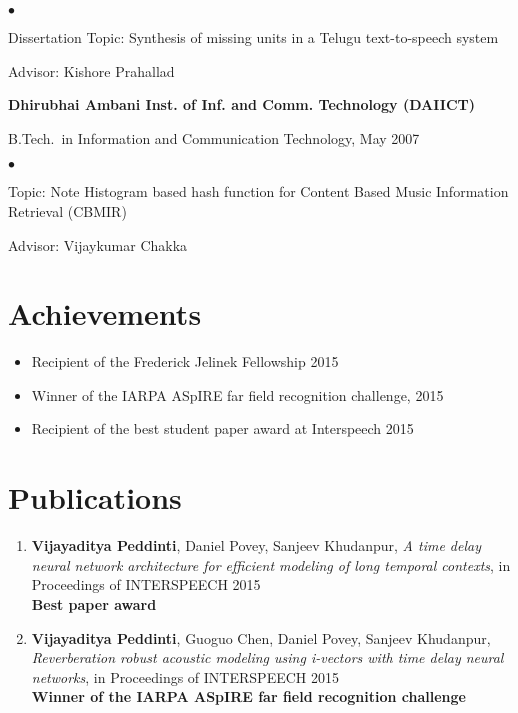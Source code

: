 \documentclass[margin,line,pifont,palatino,courier]{res}
\newenvironment{list1}{
  \begin{list}{\ding{113}}{%
      \setlength{\itemsep}{0in}
      \setlength{\parsep}{0in} \setlength{\parskip}{0in}
      \setlength{\topsep}{0in} \setlength{\partopsep}{0in}
      \setlength{\leftmargin}{0.17in}}}{\end{list}}
\newenvironment{list2}{
  \begin{list}{$\bullet$}{%
      \setlength{\itemsep}{0in}
      \setlength{\parsep}{0in} \setlength{\parskip}{0in}
      \setlength{\topsep}{0in} \setlength{\partopsep}{0in}
      \setlength{\leftmargin}{0.2in}}}{\end{list}}
\begin{document}
\begin{resume}
\begin{list1}
\begin{list2}
\vspace*{.05in}
\item Dissertation Topic:  Synthesis of missing units in a Telugu text-to-speech system 
\item Advisor: Kishore Prahallad
\end{list2}
\end{list1}

{\bf Dhirubhai Ambani Inst. of Inf. and Comm. Technology (DAIICT)}\\
\vspace*{-.1in}
\begin{list1}
\item[] B.Tech.~in Information and Communication Technology, May 2007

\begin{list2}
\vspace*{.05in}
\item Topic: Note Histogram based hash function for Content Based Music Information Retrieval (CBMIR) 
\item Advisor: Vijaykumar Chakka
\end{list2}
\end{list1}

\section{\sc Achievements}
\begin{itemize}
\item Recipient of the Frederick Jelinek Fellowship 2015
\item Winner of the IARPA ASpIRE far field recognition challenge, 2015
\item Recipient of the best student paper award at Interspeech 2015
\end{itemize}


\section{\sc Publications}
\begin{enumerate}


\item \textbf{Vijayaditya Peddinti}, Daniel Povey, Sanjeev Khudanpur,
\textit{A time delay neural network architecture for efficient modeling of long temporal contexts}, in Proceedings of INTERSPEECH 2015\\
\textbf{Best paper award}

\item \textbf{Vijayaditya Peddinti}, Guoguo Chen, Daniel Povey, Sanjeev Khudanpur,
\textit{Reverberation robust acoustic modeling using i-vectors with time delay neural networks}, in Proceedings of INTERSPEECH 2015\\
\textbf{Winner of the IARPA ASpIRE far field recognition challenge}


\end{enumerate}
\end{resume}
\end{document}
